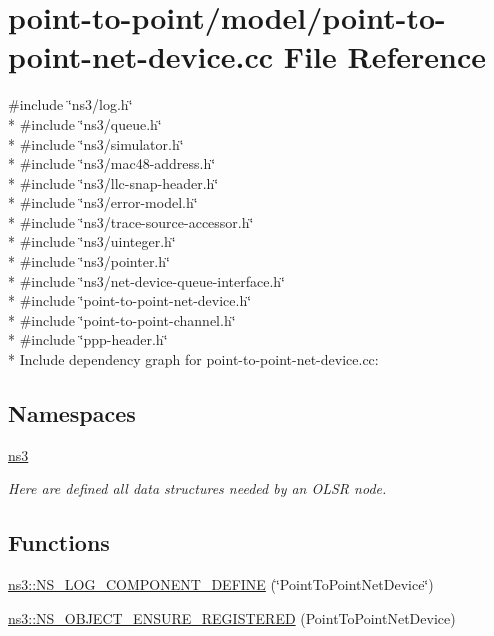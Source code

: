 \hypertarget{point-to-point-net-device_8cc}{}\section{point-\/to-\/point/model/point-\/to-\/point-\/net-\/device.cc File Reference}
\label{point-to-point-net-device_8cc}
{\ttfamily \#include \char`\"{}ns3/log.\+h\char`\"{}}\\*
{\ttfamily \#include \char`\"{}ns3/queue.\+h\char`\"{}}\\*
{\ttfamily \#include \char`\"{}ns3/simulator.\+h\char`\"{}}\\*
{\ttfamily \#include \char`\"{}ns3/mac48-\/address.\+h\char`\"{}}\\*
{\ttfamily \#include \char`\"{}ns3/llc-\/snap-\/header.\+h\char`\"{}}\\*
{\ttfamily \#include \char`\"{}ns3/error-\/model.\+h\char`\"{}}\\*
{\ttfamily \#include \char`\"{}ns3/trace-\/source-\/accessor.\+h\char`\"{}}\\*
{\ttfamily \#include \char`\"{}ns3/uinteger.\+h\char`\"{}}\\*
{\ttfamily \#include \char`\"{}ns3/pointer.\+h\char`\"{}}\\*
{\ttfamily \#include \char`\"{}ns3/net-\/device-\/queue-\/interface.\+h\char`\"{}}\\*
{\ttfamily \#include \char`\"{}point-\/to-\/point-\/net-\/device.\+h\char`\"{}}\\*
{\ttfamily \#include \char`\"{}point-\/to-\/point-\/channel.\+h\char`\"{}}\\*
{\ttfamily \#include \char`\"{}ppp-\/header.\+h\char`\"{}}\\*
Include dependency graph for point-\/to-\/point-\/net-\/device.cc\+:
\subsection*{Namespaces}
\begin{DoxyCompactItemize}
\item 
 \hyperlink{namespacens3}{ns3}
\begin{DoxyCompactList}\small\item\em Here are defined all data structures needed by an O\+L\+SR node. \end{DoxyCompactList}\end{DoxyCompactItemize}
\subsection*{Functions}
\begin{DoxyCompactItemize}
\item 
\hyperlink{namespacens3_a9b7d0144c1f762571534f4b11b5b636a}{ns3\+::\+N\+S\+\_\+\+L\+O\+G\+\_\+\+C\+O\+M\+P\+O\+N\+E\+N\+T\+\_\+\+D\+E\+F\+I\+NE} (\char`\"{}Point\+To\+Point\+Net\+Device\char`\"{})
\item 
\hyperlink{namespacens3_a66108f2551b8a8be305987f2276ee50a}{ns3\+::\+N\+S\+\_\+\+O\+B\+J\+E\+C\+T\+\_\+\+E\+N\+S\+U\+R\+E\+\_\+\+R\+E\+G\+I\+S\+T\+E\+R\+ED} (Point\+To\+Point\+Net\+Device)
\end{DoxyCompactItemize}
